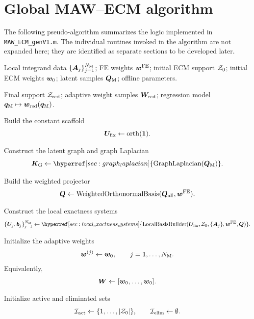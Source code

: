 \documentclass[11pt,a4paper]{article}
\begin{document}
\section{Global MAW--ECM algorithm}

The following pseudo-algorithm summarizes the logic implemented in
\texttt{MAW\_ECM\_genV1.m}. The individual routines invoked in the algorithm are
not expanded here; they are identified as separate sections to be developed
later.

%
\begin{algorithm}[H]
\footnotesize
\caption{Offline construction of MAW--ECM with fixed support and adaptive weights}
\label{alg:maw_ecm_global}
\begin{algorithmic}[1]

\Require
Local integrand data $\{\bm A_j\}_{j=1}^{N_{\mathrm{M}}}$;
FE weights $\bm w^{\mathrm{FE}}$;
initial ECM support $\mathcal{Z}_{0}$;
initial ECM weights $\bm w_{0}$;
latent samples $\bm Q_{\mathrm{M}}$;
offline parameters.

\Ensure
Final support $\mathcal{Z}_{\mathrm{red}}$;
adaptive weight samples $\bm W_{\mathrm{red}}$;
regression model $\bm q_{\mathrm{M}}\mapsto\bm w_{\mathrm{red}}(\bm q_{\mathrm{M}})$.

\vspace{0.2cm}

\State Build the constant scaffold
\[
        \bm U_{\mathrm{fix}} \gets \mathrm{orth}(\bm 1).
\]

\State Construct the latent graph and graph Laplacian
\[
        \Kgraph \gets
        \hyperref[sec:graph_laplacian]
        {\mathrm{GraphLaplacian}(\Qman)}.
\]

\State Build the weighted projector
\[
       \bm Q \gets \mathrm{WeightedOrthonormalBasis}(\bm Q_{\mathrm{all}},\bm w^{\mathrm{FE}}).
\]

\State Construct the local exactness systems
\[
        \{\Uj,\bj\}_{j=1}^{\Nman}
        \gets
        \hyperref[sec:local_exactness_systems]{\mathrm{LocalBasisBuilder}
        (\Ufixed,\Zini,\{\Aint_j\},\wFE,\Qproj)}.
\]

\State Initialize the adaptive weights
\[
        \bm w^{(j)} \gets \bm w_{0},
        \qquad
        j=1,\ldots,N_{\mathrm{M}}.
\]
Equivalently,
\[
        \bm W
        \gets
        [\bm w_{0},\ldots,\bm w_{0}].
\]

\State Initialize active and eliminated sets
\[
        \mathcal{I}_{\mathrm{act}} \gets \{1,\ldots,|\mathcal{Z}_{0}|\},
        \qquad
        \mathcal{I}_{\mathrm{elim}} \gets \emptyset.
\]


\end{algorithmic}
\end{algorithm}
\end{document}
